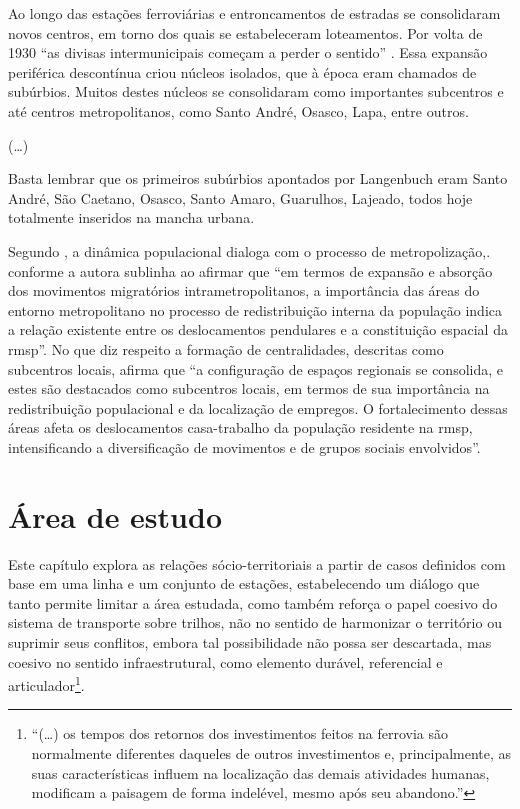 	\begin{citacao}
		Ao  longo  das  estações  ferroviárias  e  entroncamentos  de  estradas  se consolidaram  novos  centros,  em  torno  dos  quais  se  estabeleceram loteamentos. Por volta de 1930 “as divisas intermunicipais começam a perder  o  sentido” .  Essa  expansão  periférica  descontínua  criou núcleos  isolados,  que  à  época  eram  chamados  de  subúrbios.  Muitos destes  núcleos  se  consolidaram  como  importantes  subcentros  e  até centros  metropolitanos,  como  Santo  André,  Osasco,  Lapa,  entre   outros.
		
		(\dots)
	
		Basta lembrar que os primeiros subúrbios apontados por Langenbuch eram Santo André, São Caetano, Osasco, Santo Amaro, Guarulhos, Lajeado, todos hoje totalmente inseridos na mancha urbana.		
		\cite[pág. 20]{Isoda}
	\end{citacao}
	
	Segundo , a dinâmica populacional dialoga com o processo de metropolização,. conforme a autora sublinha ao afirmar que ``em termos de expansão e absorção dos movimentos migratórios intrametropolitanos, a importância das áreas do entorno metropolitano no processo de redistribuição interna da população indica a relação existente entre os deslocamentos pendulares e a constituição espacial da \gls{rmsp}''. No que diz respeito a formação de centralidades, descritas como subcentros locais,  afirma que ``a configuração de espaços regionais se consolida, e estes são destacados como subcentros locais, em termos de sua importância na redistribuição populacional e da localização de empregos. O fortalecimento dessas áreas afeta os deslocamentos casa-trabalho da população residente na \gls{rmsp}, intensificando a diversificação de movimentos e de grupos sociais envolvidos''.

%
%

	\chapter{Área de estudo}
	
	Este capítulo explora as relações sócio-territoriais a partir de casos definidos com base em uma linha e um conjunto de estações, estabelecendo um diálogo que tanto permite limitar a área estudada, como também reforça o papel coesivo do sistema de transporte sobre trilhos, não no sentido de harmonizar o território ou suprimir seus conflitos, embora tal possibilidade não possa ser descartada, mas coesivo no sentido infraestrutural, como elemento durável, referencial e articulador\footnote{``(\dots) os tempos dos retornos dos investimentos feitos na ferrovia são normalmente diferentes daqueles de outros investimentos e, principalmente, as suas características influem na localização das demais atividades humanas, modificam a paisagem de forma indelével, mesmo após seu abandono.''}.
	
